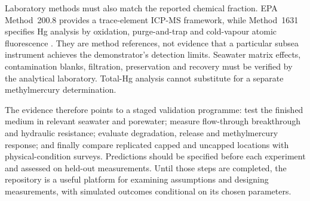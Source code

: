 Laboratory methods must also match the reported chemical fraction. EPA Method~200.8 provides a trace-element ICP-MS framework, while Method~1631 specifies Hg analysis by oxidation, purge-and-trap and cold-vapour atomic fluorescence \citep{epa2008,epa1631}. They are method references, not evidence that a particular subsea instrument achieves the demonstrator's detection limits. Seawater matrix effects, contamination blanks, filtration, preservation and recovery must be verified by the analytical laboratory. Total-Hg analysis cannot substitute for a separate methylmercury determination.

The evidence therefore points to a staged validation programme: test the finished medium in relevant seawater and porewater; measure flow-through breakthrough and hydraulic resistance; evaluate degradation, release and methylmercury response; and finally compare replicated capped and uncapped locations with physical-condition surveys. Predictions should be specified before each experiment and assessed on held-out measurements. Until those steps are completed, the repository is a useful platform for examining assumptions and designing measurements, with simulated outcomes conditional on its chosen parameters.
